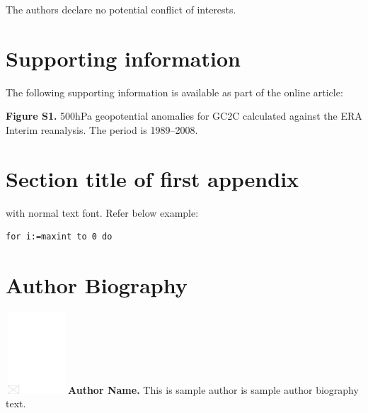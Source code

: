 \documentclass[AMA,STIX1COL]{WileyNJD-v2}
\begin{document}
The authors declare no potential conflict of interests.


\section*{Supporting information}

The following supporting information is available as part of the online article:

\noindent
\textbf{Figure S1.}
{500{\uns}hPa geopotential anomalies for GC2C calculated against the ERA Interim reanalysis. The period is 1989--2008.}


\appendix

\section{Section title of first appendix\label{app1}}

with normal text font. Refer below example:

\begin{lstlisting}[caption={Descriptive Caption Text},label=DescriptiveLabel]
for i:=maxint to 0 do
\end{lstlisting}

%

\clearpage

\section*{Author Biography}

\begin{biography}{\includegraphics[width=66pt,height=86pt,draft]{empty}}{\textbf{Author Name.} This is sample author is sample author biography text.}
\end{biography}
\end{document}
